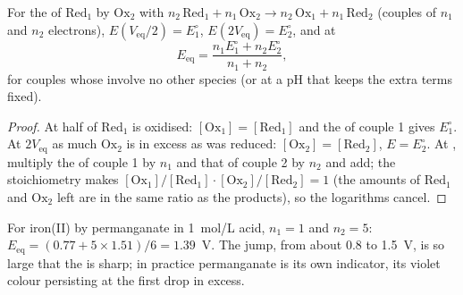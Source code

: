 \begin{proposition}\label{prop:b1:titration-methods:potentiometric-points}
For the  of $\mathrm{Red_1}$ by $\mathrm{Ox_2}$ with
$n_2\,\mathrm{Red_1} + n_1\,\mathrm{Ox_2} \to n_2\,\mathrm{Ox_1} +
n_1\,\mathrm{Red_2}$ (couples of $n_1$ and $n_2$ electrons), $E(V_{\mathrm{eq}}/2) = E^\circ_1$, $E(2V_{\mathrm{eq}}) =
E^\circ_2$, and at 
\[
  E_{\mathrm{eq}} = \frac{n_1E^\circ_1 + n_2E^\circ_2}{n_1 + n_2},
\]
for couples whose  involve no other species (or at a pH
that keeps the extra terms fixed).
\end{proposition}

\begin{proof}
At  half of $\mathrm{Red_1}$ is oxidised:
$[\mathrm{Ox_1}] = [\mathrm{Red_1}]$ and the  of couple 1
gives $E^\circ_1$. At $2V_{\mathrm{eq}}$ as much $\mathrm{Ox_2}$ is in excess as
was reduced: $[\mathrm{Ox_2}] = [\mathrm{Red_2}]$, $E = E^\circ_2$. At
, multiply the  of couple 1 by $n_1$ and that of
couple 2 by $n_2$ and add; the stoichiometry makes
$[\mathrm{Ox_1}]/[\mathrm{Red_1}] \cdot [\mathrm{Ox_2}]/[\mathrm{Red_2}] = 1$
(the amounts of $\mathrm{Red_1}$ and $\mathrm{Ox_2}$ left are in the same
ratio as the products), so the logarithms cancel.
\end{proof}

For iron(II) by permanganate in \qty{1}{mol/L} acid, $n_1 = 1$ and $n_2 =
5$: $E_{\mathrm{eq}} = (0.77 + 5 \times 1.51)/6 = 1.39$~V. The jump, from
about 0.8 to 1.5~V, is so large that the  is sharp; in practice
permanganate is its own indicator, its violet colour persisting at the
first drop in excess.

